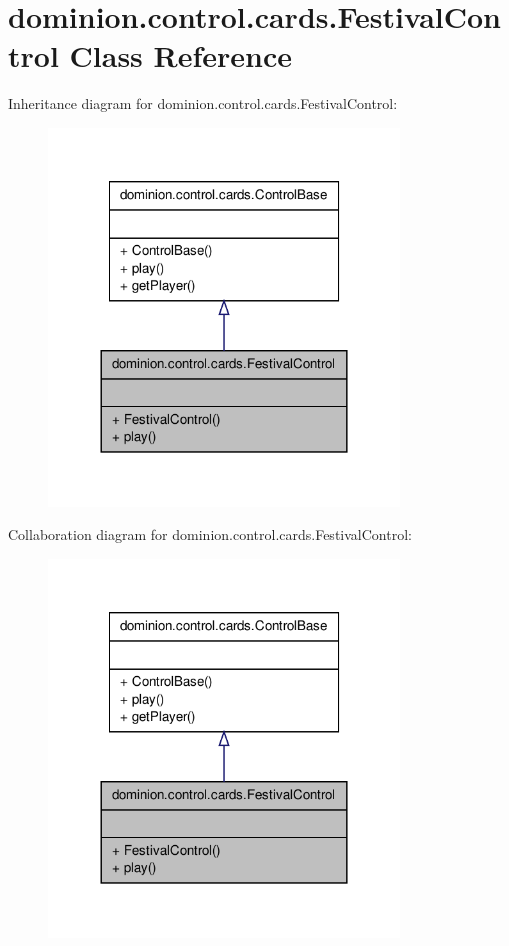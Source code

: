\hypertarget{classdominion_1_1control_1_1cards_1_1FestivalControl}{\section{dominion.\-control.\-cards.\-Festival\-Control \-Class \-Reference}
\label{classdominion_1_1control_1_1cards_1_1FestivalControl}
}


\-Inheritance diagram for dominion.\-control.\-cards.\-Festival\-Control\-:
\nopagebreak
\begin{figure}[H]
\begin{center}
\leavevmode
\includegraphics[width=264pt]{classdominion_1_1control_1_1cards_1_1FestivalControl__inherit__graph}
\end{center}
\end{figure}


\-Collaboration diagram for dominion.\-control.\-cards.\-Festival\-Control\-:
\nopagebreak
\begin{figure}[H]
\begin{center}
\leavevmode
\includegraphics[width=264pt]{classdominion_1_1control_1_1cards_1_1FestivalControl__coll__graph}
\end{center}
\end{figure}
